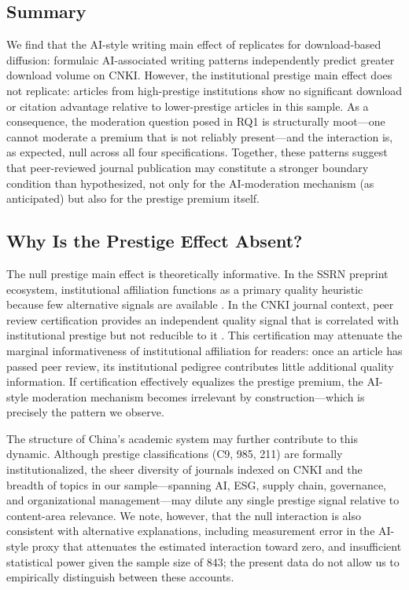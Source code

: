 \documentclass[12pt,a4paper]{article}
\begin{document}
\subsection{Summary}

We find that the AI-style writing main effect of \citet{JoLi2026}
replicates for download-based diffusion: formulaic AI-associated
writing patterns independently predict greater download volume on CNKI.
However, the institutional prestige main effect does not replicate:
articles from high-prestige institutions show no significant download
or citation advantage relative to lower-prestige articles in this sample.
As a consequence, the moderation question posed in RQ1 is structurally
moot---one cannot moderate a premium that is not reliably present---and
the interaction is, as expected, null across all four specifications.
Together, these patterns suggest that peer-reviewed journal publication
may constitute a stronger boundary condition than hypothesized, not only
for the AI-moderation mechanism (as anticipated) but also for the
prestige premium itself.

\subsection{Why Is the Prestige Effect Absent?}

The null prestige main effect is theoretically informative.
In the SSRN preprint ecosystem, institutional affiliation functions as
a primary quality heuristic because few alternative signals are
available \citep{JoLi2026}.
In the CNKI journal context, peer review certification provides an
independent quality signal that is correlated with institutional
prestige but not reducible to it \citep{Bornmann2008}.
This certification may attenuate the marginal informativeness of
institutional affiliation for readers: once an article has passed
peer review, its institutional pedigree contributes little additional
quality information.
If certification effectively equalizes the prestige premium, the AI-style
moderation mechanism becomes irrelevant by construction---which is
precisely the pattern we observe.

The structure of China's academic system may further contribute to
this dynamic.
Although prestige classifications (C9, 985, 211) are formally
institutionalized, the sheer diversity of journals indexed on CNKI
and the breadth of topics in our sample---spanning AI, ESG, supply
chain, governance, and organizational management---may dilute any
single prestige signal relative to content-area relevance.
We note, however, that the null interaction is also consistent with
alternative explanations, including measurement error in the AI-style
proxy that attenuates the estimated interaction toward zero, and
insufficient statistical power given the sample size of 843;
the present data do not allow us to empirically distinguish between
these accounts.
\end{document}
